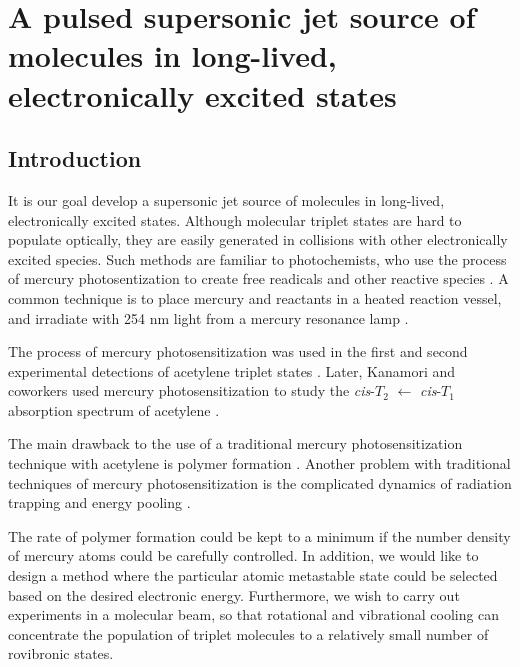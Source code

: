 % 



\chapter{A pulsed supersonic jet source of molecules in long-lived,
  electronically excited states
}

\section{Introduction}


It is our goal develop a supersonic jet source of molecules in
long-lived, electronically excited states.  Although molecular triplet
states are hard to populate optically, they are easily generated in
collisions with other electronically excited species.  Such methods
are familiar to photochemists, who use the process of mercury
photosentization to create free readicals and other reactive species
\cite{brown89, brown88, crabtree92, cvetanovic64, phillips74,
  strausz70}.  A common technique is to place mercury and reactants in
a heated reaction vessel, and irradiate with 254 nm light from a
mercury resonance lamp \cite{brown87}.

The process of mercury photosensitization was used in the first and
second experimental detections of acetylene triplet states
\cite{burton72, wendt79}.  Later, Kanamori and coworkers used mercury
photosensitization to study the \emph{cis}-$T_2$ $\leftarrow$
\emph{cis}-$T_1$ absorption spectrum of acetylene \cite{kanamori07}.

The main drawback to the use of a traditional mercury
photosensitization technique with acetylene is polymer formation
\cite{shida58, leroy44}.  Another problem with traditional techniques
of mercury photosensitization is the complicated dynamics of radiation
trapping and energy pooling \cite{menningen00, herd05, majetich89,
  majetich91}.

The rate of polymer formation could be kept to a minimum if the number
density of mercury atoms could be carefully controlled.  In addition,
we would like to design a method where the particular atomic
metastable state could be selected based on the desired electronic
energy.  Furthermore, we wish to carry out experiments in a molecular
beam, so that rotational and vibrational cooling can concentrate the
population of triplet molecules to a relatively small number of
rovibronic states.

